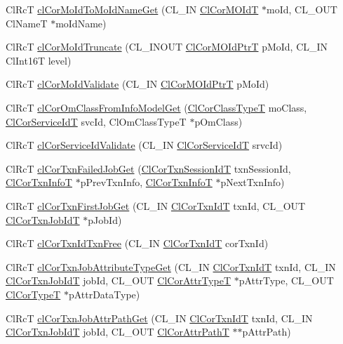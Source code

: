 \begin{CompactItemize}
\item 
Cl\-Rc\-T \hyperlink{group__group13_ga117}{cl\-Cor\-Mo\-Id\-To\-Mo\-Id\-Name\-Get} (CL\_\-IN \hyperlink{struct_cl_cor_m_o_id}{Cl\-Cor\-MOId\-T} $\ast$mo\-Id, CL\_\-OUT Cl\-Name\-T $\ast$mo\-Id\-Name)
\item 
Cl\-Rc\-T \hyperlink{group__group13_ga110}{cl\-Cor\-Mo\-Id\-Truncate} (CL\_\-INOUT \hyperlink{struct_cl_cor_m_o_id}{Cl\-Cor\-MOId\-Ptr\-T} p\-Mo\-Id, CL\_\-IN Cl\-Int16T level)
\item 
Cl\-Rc\-T \hyperlink{group__group13_ga120}{cl\-Cor\-Mo\-Id\-Validate} (CL\_\-IN \hyperlink{struct_cl_cor_m_o_id}{Cl\-Cor\-MOId\-Ptr\-T} p\-Mo\-Id)
\item 
Cl\-Rc\-T \hyperlink{group__group13_ga87}{cl\-Cor\-Om\-Class\-From\-Info\-Model\-Get} (\hyperlink{group__group13_ga2}{Cl\-Cor\-Class\-Type\-T} mo\-Class, \hyperlink{group__group13_ga339}{Cl\-Cor\-Service\-Id\-T} svc\-Id, Cl\-Om\-Class\-Type\-T $\ast$p\-Om\-Class)
\item 
Cl\-Rc\-T \hyperlink{group__group13_ga127}{cl\-Cor\-Service\-Id\-Validate} (CL\_\-IN \hyperlink{group__group13_ga339}{Cl\-Cor\-Service\-Id\-T} srvc\-Id)
\item 
Cl\-Rc\-T \hyperlink{group__group13_ga82}{cl\-Cor\-Txn\-Failed\-Job\-Get} (\hyperlink{group__group13_ga16}{Cl\-Cor\-Txn\-Session\-Id\-T} txn\-Session\-Id, \hyperlink{struct_cl_cor_txn_info}{Cl\-Cor\-Txn\-Info\-T} $\ast$p\-Prev\-Txn\-Info, \hyperlink{struct_cl_cor_txn_info}{Cl\-Cor\-Txn\-Info\-T} $\ast$p\-Next\-Txn\-Info)
\item 
Cl\-Rc\-T \hyperlink{group__group13_ga78}{cl\-Cor\-Txn\-First\-Job\-Get} (CL\_\-IN \hyperlink{group__group13_ga17}{Cl\-Cor\-Txn\-Id\-T} txn\-Id, CL\_\-OUT \hyperlink{group__group13_ga18}{Cl\-Cor\-Txn\-Job\-Id\-T} $\ast$p\-Job\-Id)
\item 
Cl\-Rc\-T \hyperlink{group__group13_ga71}{cl\-Cor\-Txn\-Id\-Txn\-Free} (CL\_\-IN \hyperlink{group__group13_ga17}{Cl\-Cor\-Txn\-Id\-T} cor\-Txn\-Id)
\item 
Cl\-Rc\-T \hyperlink{group__group13_ga72}{cl\-Cor\-Txn\-Job\-Attribute\-Type\-Get} (CL\_\-IN \hyperlink{group__group13_ga17}{Cl\-Cor\-Txn\-Id\-T} txn\-Id, CL\_\-IN \hyperlink{group__group13_ga18}{Cl\-Cor\-Txn\-Job\-Id\-T} job\-Id, CL\_\-OUT \hyperlink{group__group13_ga10}{Cl\-Cor\-Attr\-Type\-T} $\ast$p\-Attr\-Type, CL\_\-OUT \hyperlink{group__group13_ga9}{Cl\-Cor\-Type\-T} $\ast$p\-Attr\-Data\-Type)
\item 
Cl\-Rc\-T \hyperlink{group__group13_ga74}{cl\-Cor\-Txn\-Job\-Attr\-Path\-Get} (CL\_\-IN \hyperlink{group__group13_ga17}{Cl\-Cor\-Txn\-Id\-T} txn\-Id, CL\_\-IN \hyperlink{group__group13_ga18}{Cl\-Cor\-Txn\-Job\-Id\-T} job\-Id, CL\_\-OUT \hyperlink{struct_cl_cor_attr_path}{Cl\-Cor\-Attr\-Path\-T} $\ast$$\ast$p\-Attr\-Path)
$$
\end{CompactItemize}
